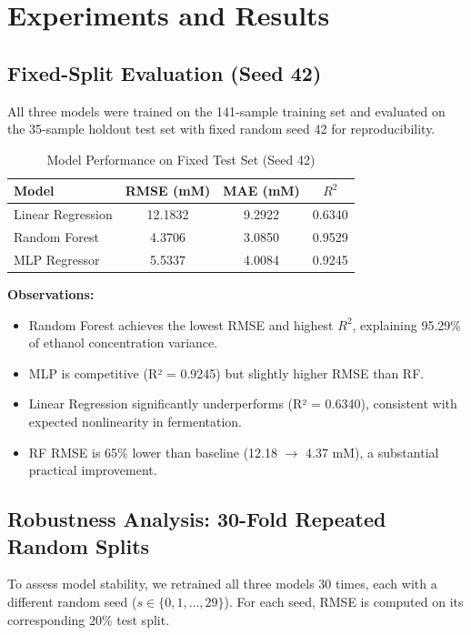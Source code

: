 \documentclass[conference]{IEEEtran}
\begin{document}
\section{Experiments and Results}

\subsection{Fixed-Split Evaluation (Seed 42)}

All three models were trained on the 141-sample training set and evaluated on the 35-sample holdout test set with fixed random seed 42 for reproducibility.

\begin{table}[htbp]
\caption{Model Performance on Fixed Test Set (Seed 42)}
\centering
\begin{tabular}{lccc}
\toprule
Model & RMSE (mM) & MAE (mM) & $R^2$ \\
\midrule
Linear Regression & 12.1832 & 9.2922 & 0.6340 \\
Random Forest & 4.3706 & 3.0850 & 0.9529 \\
MLP Regressor & 5.5337 & 4.0084 & 0.9245 \\
\bottomrule
\end{tabular}
\end{table}

\textbf{Observations:}
\begin{itemize}
\item Random Forest achieves the lowest RMSE and highest $R^2$, explaining 95.29\% of ethanol concentration variance.
\item MLP is competitive (R² = 0.9245) but slightly higher RMSE than RF.
\item Linear Regression significantly underperforms (R² = 0.6340), consistent with expected nonlinearity in fermentation.
\item RF RMSE is 65\% lower than baseline (12.18 $\to$ 4.37 mM), a substantial practical improvement.
\end{itemize}

\subsection{Robustness Analysis: 30-Fold Repeated Random Splits}

To assess model stability, we retrained all three models 30 times, each with a different random seed ($s \in \{0, 1, \ldots, 29\}$). For each seed, RMSE is computed on its corresponding 20\% test split.
\end{document}
